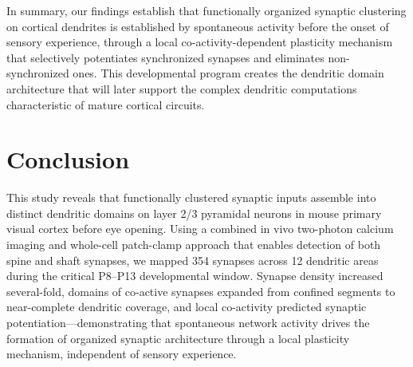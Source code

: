 \documentclass[11pt]{article}
\begin{document}
In summary, our findings establish that functionally organized synaptic clustering on cortical dendrites is established by spontaneous activity before the onset of sensory experience, through a local co-activity-dependent plasticity mechanism that selectively potentiates synchronized synapses and eliminates non-synchronized ones. This developmental program creates the dendritic domain architecture that will later support the complex dendritic computations characteristic of mature cortical circuits.

\section{Conclusion}

This study reveals that functionally clustered synaptic inputs assemble into distinct dendritic domains on layer 2/3 pyramidal neurons in mouse primary visual cortex before eye opening. Using a combined in vivo two-photon calcium imaging and whole-cell patch-clamp approach that enables detection of both spine and shaft synapses, we mapped 354 synapses across 12 dendritic areas during the critical P8--P13 developmental window. Synapse density increased several-fold, domains of co-active synapses expanded from confined segments to near-complete dendritic coverage, and local co-activity predicted synaptic potentiation---demonstrating that spontaneous network activity drives the formation of organized synaptic architecture through a local plasticity mechanism, independent of sensory experience.



\end{document}
